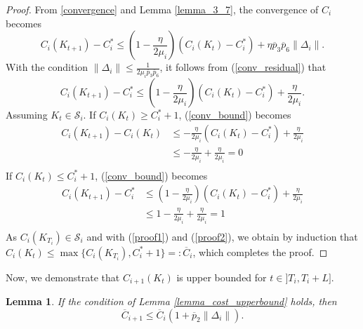 \documentclass[letterpaper, 10 pt, conference]{ieeeconf}  %
\newtheorem{lemma}{Lemma}
\begin{document}
\begin{proof} From \eqref{convergence} and Lemma \ref{lemma_3_7}, the convergence of $C_i$ becomes 
\begin{equation*}
\label{conv_residual}
C_i(K_{t+1}) - C_i^* \leq (1 - \frac{\eta}{2\mu_i}) (C_i(K_t) - C_i^*) + \eta \overline{p}_3 \overline{p}_6 \|\Delta_i\|.
\end{equation*}
With the condition $\|\Delta_i\| \leq \frac{1}{2\mu_i \overline{p}_3 \overline{p}_6}$, it follows from (\ref{conv_residual}) that
\begin{equation}
\label{conv_bound}
C_i(K_{t+1}) - C_i^* \leq (1 - \frac{\eta}{2\mu_i}) (C_i(K_t) - C_i^*) + \frac{\eta}{2\mu_i}.
\end{equation}
Assuming \( K_t \in \mathcal{S}_i \). If $C_i(K_t) \geq C_i^* + 1$, (\ref{conv_bound}) becomes
\begin{equation}
\label{proof1}
\begin{aligned}
        C_i(K_{t+1}) - C_i(K_t) &\leq - \frac{\eta}{2\mu_i} (C_i(K_t) - C_i^*) + \frac{\eta}{2\mu_i} \\
        &\leq - \frac{\eta}{2\mu_i}  + \frac{\eta}{2\mu_i} = 0\\
\end{aligned}
\end{equation}
If $C_i(K_t) \leq C_i^* + 1$, (\ref{conv_bound}) becomes
\begin{equation}
\label{proof2}
\begin{aligned}
    C_i(K_{t+1}) - C_i^* &\leq (1- \frac{\eta}{2\mu_i}) (C_i(K_t) - C_i^*) + \frac{\eta}{2\mu_i} \\
    &\leq 1- \frac{\eta}{2\mu_i} + \frac{\eta}{2\mu_i} = 1\\
\end{aligned}
\end{equation}
As $C_i(K_{T_i}) \in \mathcal{S}_i$ and with (\ref{proof1}) and (\ref{proof2}), we obtain by induction that  
    $C_i(K_{t}) \leq \max\{C_i(K_{T_i}), C_i^* + 1\} =: \overline{C}_i$,
which completes the proof. 
\end{proof} \vspace{2mm}
Now, we demonstrate that $C_{i+1}(K_t)$ is upper bounded for $t \in ]T_i, T_i + L]$. 
\begin{lemma}
\label{lemma_c1_upperbound}
    If the condition of Lemma \ref{lemma_cost_upperbound} holds, then 
\begin{equation}
\label{3.42}
    \overline{C}_{i+1} \leq \overline{C}_i(1+\overline{p}_2 \|\Delta_i\|).
\end{equation}
\end{lemma} 
\end{document}
